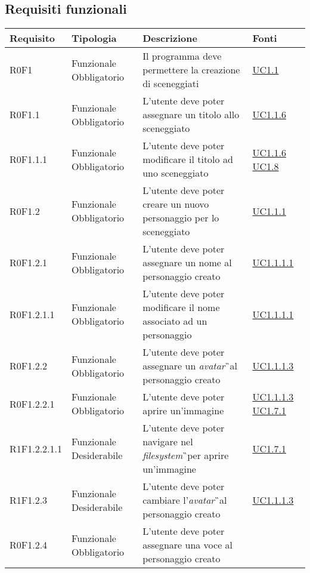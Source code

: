 \subsection{Requisiti funzionali}
\begin{center}
\def\arraystretch{1.6}
\bgroup
\begin{longtable}{| p{2.5cm} | p{3cm} | p{5.25cm} | p{2cm} |}
\hline
\textbf{Requisito} & \textbf{Tipologia} & \textbf{Descrizione} & \textbf{Fonti}\\ \hline \hline  R0F1 & Funzionale \newline Obbligatorio & Il programma deve permettere la creazione di sceneggiati &  \hyperref[sec:UC1.1]{ UC1.1 }  \\ \hline  R0F1.1 & Funzionale \newline Obbligatorio & L'utente deve poter assegnare un titolo allo sceneggiato &  \hyperref[sec:UC1.1.6]{ UC1.1.6 }  \\ \hline  R0F1.1.1 & Funzionale \newline Obbligatorio & L'utente deve poter modificare il titolo ad uno sceneggiato &  \hyperref[sec:UC1.1.6]{ UC1.1.6 } \newline \hyperref[sec:UC1.8]{ UC1.8 }  \\ \hline  R0F1.2 & Funzionale \newline Obbligatorio & L'utente deve poter creare un nuovo personaggio per lo sceneggiato &  \hyperref[sec:UC1.1.1]{ UC1.1.1 }  \\ \hline  R0F1.2.1 & Funzionale \newline Obbligatorio & L'utente deve poter assegnare un nome al personaggio creato &  \hyperref[sec:UC1.1.1.1]{ UC1.1.1.1 }  \\ \hline  R0F1.2.1.1 & Funzionale \newline Obbligatorio & L'utente deve poter modificare il nome associato ad un personaggio &  \hyperref[sec:UC1.1.1.1]{ UC1.1.1.1 }  \\ \hline  R0F1.2.2 & Funzionale \newline Obbligatorio & L'utente deve poter assegnare un \textit{avatar}\G\ al personaggio creato &  \hyperref[sec:UC1.1.1.3]{ UC1.1.1.3 }  \\ \hline  R0F1.2.2.1 & Funzionale \newline Obbligatorio & L'utente deve poter aprire un'immagine &  \hyperref[sec:UC1.1.1.3]{ UC1.1.1.3 } \newline \hyperref[sec:UC1.7.1]{ UC1.7.1 }  \\ \hline  R1F1.2.2.1.1 & Funzionale \newline Desiderabile & L'utente deve poter navigare nel \textit{filesystem}\G\ per aprire un'immagine &  \hyperref[sec:UC1.7.1]{ UC1.7.1 }  \\ \hline  R1F1.2.3 & Funzionale \newline Desiderabile & L'utente deve poter cambiare l'\textit{avatar}\G\ al personaggio creato &  \hyperref[sec:UC1.1.1.3]{ UC1.1.1.3 }  \\ \hline  R0F1.2.4 & Funzionale \newline Obbligatorio & L'utente deve poter assegnare una voce al personaggio creato &  
\end{longtable}
\end{center}
